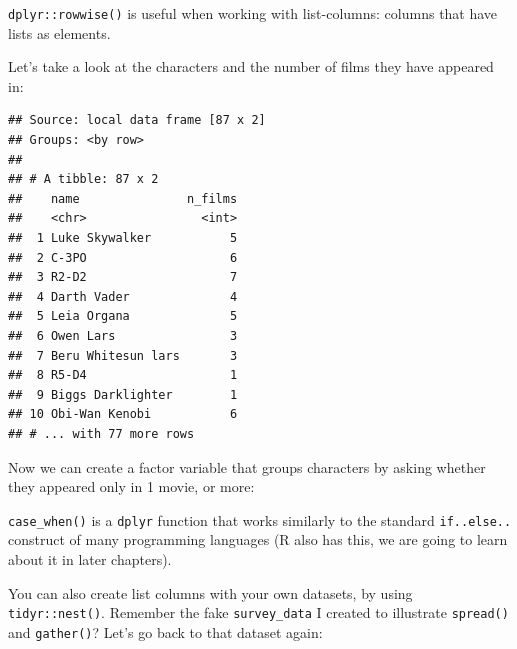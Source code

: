 \documentclass[]{gitbook}
\newenvironment{Shaded}{\begin{snugshade}}{\end{snugshade}}
\newcommand{\DataTypeTok}[1]{\textcolor[rgb]{0.13,0.29,0.53}{#1}}
\newcommand{\DecValTok}[1]{\textcolor[rgb]{0.00,0.00,0.81}{#1}}
\newcommand{\KeywordTok}[1]{\textcolor[rgb]{0.13,0.29,0.53}{\textbf{#1}}}
\newcommand{\NormalTok}[1]{#1}
\newcommand{\OperatorTok}[1]{\textcolor[rgb]{0.81,0.36,0.00}{\textbf{#1}}}
\newcommand{\StringTok}[1]{\textcolor[rgb]{0.31,0.60,0.02}{#1}}
\begin{document}
\texttt{dplyr::rowwise()} is useful when working with list-columns: columns that have lists as elements.

Let's take a look at the characters and the number of films they have appeared in:

\begin{Shaded}
\end{Shaded}

\begin{verbatim}
## Source: local data frame [87 x 2]
## Groups: <by row>
## 
## # A tibble: 87 x 2
##    name               n_films
##    <chr>                <int>
##  1 Luke Skywalker           5
##  2 C-3PO                    6
##  3 R2-D2                    7
##  4 Darth Vader              4
##  5 Leia Organa              5
##  6 Owen Lars                3
##  7 Beru Whitesun lars       3
##  8 R5-D4                    1
##  9 Biggs Darklighter        1
## 10 Obi-Wan Kenobi           6
## # ... with 77 more rows
\end{verbatim}

Now we can create a factor variable that groups characters by asking whether they appeared only in
1 movie, or more:

\begin{Shaded}
\end{Shaded}

\texttt{case\_when()} is a \texttt{dplyr} function that works similarly to the standard \texttt{if..else..} construct of
many programming languages (R also has this, we are going to learn about it in later chapters).

You can also create list columns with your own datasets, by using \texttt{tidyr::nest()}. Remember the
fake \texttt{survey\_data} I created to illustrate \texttt{spread()} and \texttt{gather()}? Let's go back to that dataset
again:
\end{document}
